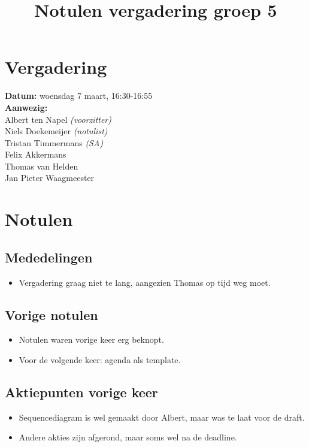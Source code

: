 \documentclass[a4paper]{article}
\title{ Notulen vergadering groep 5 }
\begin{document}
\maketitle

\section{Vergadering}
{\bf Datum:} woensdag 7 maart, 16:30-16:55 \\
{\bf Aanwezig:}\\
Albert ten Napel {\it (voorzitter)} \\
Niels Doekemeijer {\it (notulist)} \\
Tristan Timmermans {\it (SA)} \\
Felix Akkermans \\
Thomas van Helden \\
Jan Pieter Waagmeester \\

\section{Notulen}

\subsection{Mededelingen}
\begin{itemize}
\renewcommand{\labelitemi}{$\bullet$}
\item Vergadering graag niet te lang, aangezien Thomas op tijd weg moet.
\end{itemize}

\subsection{Vorige notulen}
\begin{itemize}
\renewcommand{\labelitemi}{$\bullet$}
\item Notulen waren vorige keer erg beknopt.
\item Voor de volgende keer: agenda als template.
\end{itemize}

\subsection{Aktiepunten vorige keer}
\begin{itemize}
\renewcommand{\labelitemi}{$\bullet$}
\item Sequencediagram is wel gemaakt door Albert, maar was te laat voor de draft.
\item Andere akties zijn afgerond, maar soms wel na de deadline.
\end{itemize}
\end{document}
